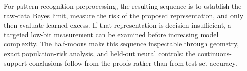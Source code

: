 {For pattern-recognition preprocessing, the resulting sequence is to establish the raw-data Bayes limit, measure the risk of the proposed representation, and only then evaluate learned excess. If that representation is decision-insufficient, a targeted low-bit measurement can be examined before increasing model complexity. The half-moons make this sequence inspectable through geometry, exact population-risk analysis, and held-out neural controls; the continuous-support conclusions follow from the proofs rather than from test-set accuracy.
}
